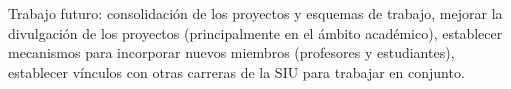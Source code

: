 \documentclass[conference]{IEEEtran}
\begin{document}

Trabajo futuro: consolidación de los proyectos y esquemas de trabajo, mejorar la
divulgación de los proyectos (principalmente en el ámbito académico), establecer
mecanismos para incorporar nuevos miembros (profesores y estudiantes),
establecer vínculos con otras carreras de la SIU para trabajar en conjunto. 





%






\end{document}
